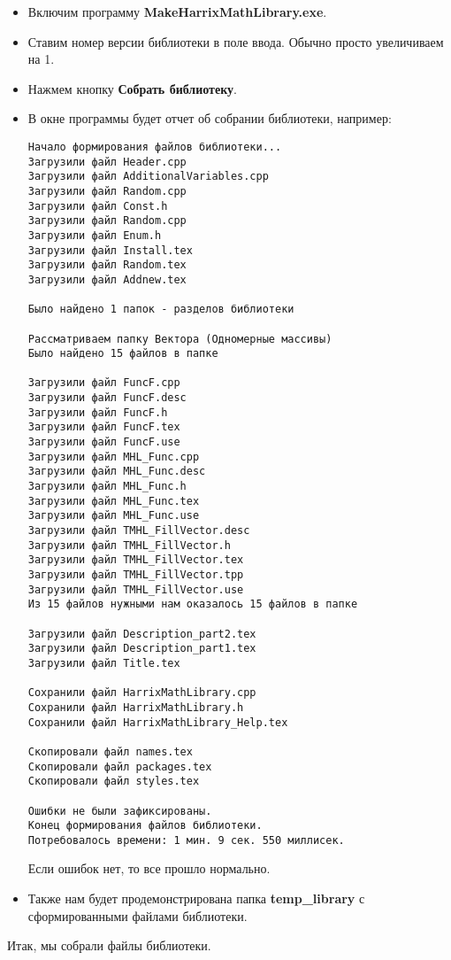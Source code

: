 \documentclass[a4paper,12pt]{article}
\begin{document}
\begin{itemize}
\item Включим программу \textbf{MakeHarrixMathLibrary.exe}.
\item Ставим номер версии библиотеки в поле ввода. Обычно просто увеличиваем на 1.
\item Нажмем кнопку \textbf{Собрать библиотеку}.
\item В окне программы будет отчет об собрании библиотеки, например:
\begin{lstlisting}[label=examplereport, caption=Пример отчета о сборке библиотеки]
Начало формирования файлов библиотеки...
Загрузили файл Header.cpp
Загрузили файл AdditionalVariables.cpp
Загрузили файл Random.cpp
Загрузили файл Const.h
Загрузили файл Random.cpp
Загрузили файл Enum.h
Загрузили файл Install.tex
Загрузили файл Random.tex
Загрузили файл Addnew.tex

Было найдено 1 папок - разделов библиотеки

Рассматриваем папку Вектора (Одномерные массивы)
Было найдено 15 файлов в папке

Загрузили файл FuncF.cpp
Загрузили файл FuncF.desc
Загрузили файл FuncF.h
Загрузили файл FuncF.tex
Загрузили файл FuncF.use
Загрузили файл MHL_Func.cpp
Загрузили файл MHL_Func.desc
Загрузили файл MHL_Func.h
Загрузили файл MHL_Func.tex
Загрузили файл MHL_Func.use
Загрузили файл TMHL_FillVector.desc
Загрузили файл TMHL_FillVector.h
Загрузили файл TMHL_FillVector.tex
Загрузили файл TMHL_FillVector.tpp
Загрузили файл TMHL_FillVector.use
Из 15 файлов нужными нам оказалось 15 файлов в папке

Загрузили файл Description_part2.tex
Загрузили файл Description_part1.tex
Загрузили файл Title.tex

Сохранили файл HarrixMathLibrary.cpp
Сохранили файл HarrixMathLibrary.h
Сохранили файл HarrixMathLibrary_Help.tex

Скопировали файл names.tex
Скопировали файл packages.tex
Скопировали файл styles.tex

Ошибки не были зафиксированы.
Конец формирования файлов библиотеки.
Потребовалось времени: 1 мин. 9 сек. 550 миллисек.
\end{lstlisting}

Если ошибок нет, то все прошло нормально.
\item Также нам будет продемонстрирована папка \textbf{temp\_library} с сформированными файлами библиотеки.
\end{itemize}

Итак, мы собрали файлы библиотеки.
\end{document}

